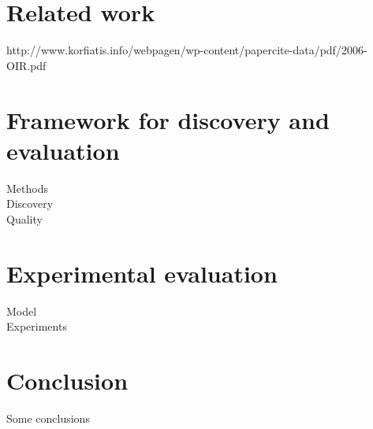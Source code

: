 \documentclass{llncs}
\begin{document}
%
\section{Related work}
%
http://www.korfiatis.info/webpagen/wp-content/papercite-data/pdf/2006-OIR.pdf

\section{Framework for discovery and evaluation}
Methods\\
Discovery\\
    Quality
    
\section{Experimental evaluation}
    Model\\
    Experiments
    
\section{Conclusion}
Some conclusions

%
%
\nocite{*}


\end{document}

